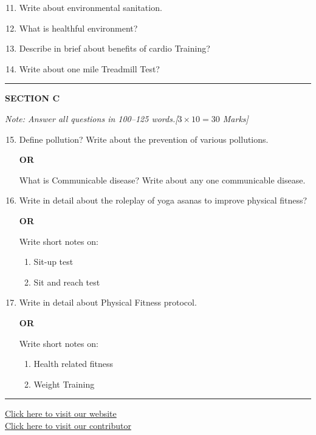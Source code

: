 \documentclass[11pt,a4paper]{article}
\begin{document}
\begin{enumerate}[label=   \textbf{\arabic*.}]
    \setcounter{enumi}{10}
    \item Write about environmental sanitation.
    \item What is healthful environment?
    \item Describe in brief about benefits of cardio Training?
    \item Write about one mile Treadmill Test?
\end{enumerate}

\bigskip
\rule{\linewidth}{0.2pt}
\medskip

\centerline{   \textbf{SECTION C}}
\smallskip



\noindent   \textit{Note: Answer all questions in 100--125 words.\hfill [$3  \times 10 = 30$ Marks]}


\begin{enumerate}[label=   \textbf{\arabic*.}]
    \setcounter{enumi}{14}
    \item Define pollution? Write about the prevention of various pollutions.
    
    
\begin{center}   \textbf{OR}\end{center}

    What is Communicable disease? Write about any one communicable disease.

    \item Write in detail about the roleplay of yoga asanas to improve physical fitness?

    
\begin{center}   \textbf{OR}\end{center}

    Write short notes on:
    
\begin{enumerate}[label=(\roman*)]
        \item Sit-up test
        \item Sit and reach test
    \end{enumerate}

    \item Write in detail about Physical Fitness protocol.

    
\begin{center}   \textbf{OR}\end{center}

    Write short notes on:
    
\begin{enumerate}[label=(\roman*)]
        \item Health related fitness
        \item Weight Training
    \end{enumerate}
\end{enumerate}

\vfill
\rule{\linewidth}{0.4pt}

\begin{center}\small
\href{https://bhu-exam.vercel.app/}{Click here to visit our website}\\[4pt]
\href{https://me-aryan.vercel.app/}{Click here to visit our contributor}
\end{center}
\end{document}
